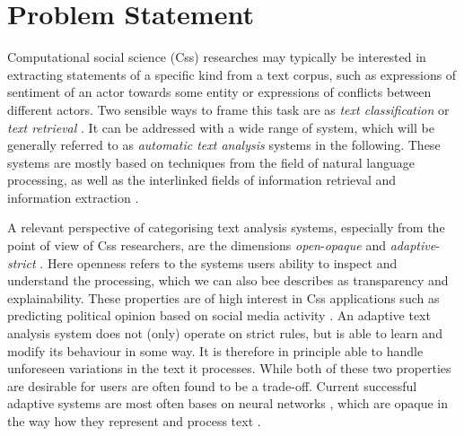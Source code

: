\documentclass[11pt]{scrreprt}
\let\cite\parencite  %
\begin{document}
%



%

\chapter{Problem Statement}
\label{cha:problem-statement}
Computational social science (C\gls{ss}) researches may typically be interested in extracting statements of a specific kind from a text corpus, such as expressions of sentiment of an actor towards some entity or expressions of conflicts between different actors. Two sensible ways to frame this task are as \textit{text classification} \cite{kowsariTextClassificationAlgorithms2019} or \textit{text retrieval} \cite{manningIntroductionInformationRetrieval2008}. It can be addressed with a wide range of system, which will be generally referred to as  \textit{automatic text analysis} systems in the following. These systems are mostly based on techniques from the field of natural language processing, as well as the interlinked fields of information retrieval and information extraction \cite{chowdharyNaturalLanguageProcessing2020}.

A relevant perspective of categorising text analysis systems, especially from the point of view of C\gls{ss} researchers, are the dimensions \textit{open}-\textit{opaque} and \textit{adaptive}-\textit{strict} \cite{menezesSemanticHypergraphs2021}. Here openness refers to the systems users ability to inspect and understand the processing, which we can also bee describes as transparency and explainability. These properties are of high interest in C\gls{ss} applications such as predicting political opinion based on social media activity \cite{wilkersonLargeScaleComputerizedText2017}. An adaptive text analysis system does not (only) operate on strict rules, but is able to learn and modify its behaviour in some way. It is therefore in principle able to handle unforeseen variations in the text it processes. While both of these two properties are desirable for users are often found to be a trade-off. Current successful adaptive systems are most often bases on neural networks \cite{hirschbergAdvancesNaturalLanguage2015}, which are opaque in the way how they represent and process text \cite{rudinStopExplainingBlack2019}.
\end{document}
